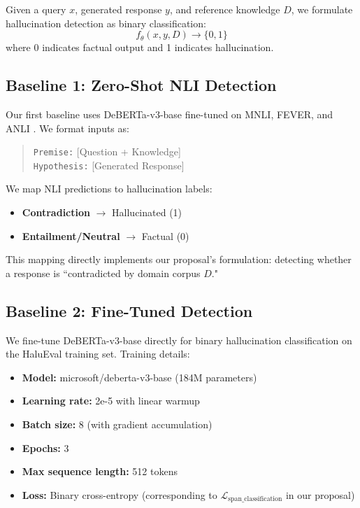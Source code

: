 \documentclass[11pt]{article}
\begin{document}
Given a query $x$, generated response $y$, and reference knowledge $D$, we formulate hallucination detection as binary classification:
\begin{equation}
f_\theta(x, y, D) \rightarrow \{0, 1\}
\end{equation}
where 0 indicates factual output and 1 indicates hallucination.

\subsection{Baseline 1: Zero-Shot NLI Detection}

Our first baseline uses DeBERTa-v3-base fine-tuned on MNLI, FEVER, and ANLI \cite{he2021deberta}. We format inputs as:

\begin{quote}
\texttt{Premise:} [Question + Knowledge] \\
\texttt{Hypothesis:} [Generated Response]
\end{quote}

We map NLI predictions to hallucination labels:
\begin{itemize}
    \item \textbf{Contradiction} $\rightarrow$ Hallucinated (1)
    \item \textbf{Entailment/Neutral} $\rightarrow$ Factual (0)
\end{itemize}

This mapping directly implements our proposal's formulation: detecting whether a response is ``contradicted by domain corpus $D$."

\subsection{Baseline 2: Fine-Tuned Detection}

We fine-tune DeBERTa-v3-base directly for binary hallucination classification on the HaluEval training set. Training details:
\begin{itemize}
    \item \textbf{Model:} microsoft/deberta-v3-base (184M parameters)
    \item \textbf{Learning rate:} 2e-5 with linear warmup
    \item \textbf{Batch size:} 8 (with gradient accumulation)
    \item \textbf{Epochs:} 3
    \item \textbf{Max sequence length:} 512 tokens
    \item \textbf{Loss:} Binary cross-entropy (corresponding to $\mathcal{L}_{\text{span\_classification}}$ in our proposal)
\end{itemize}
\end{document}
